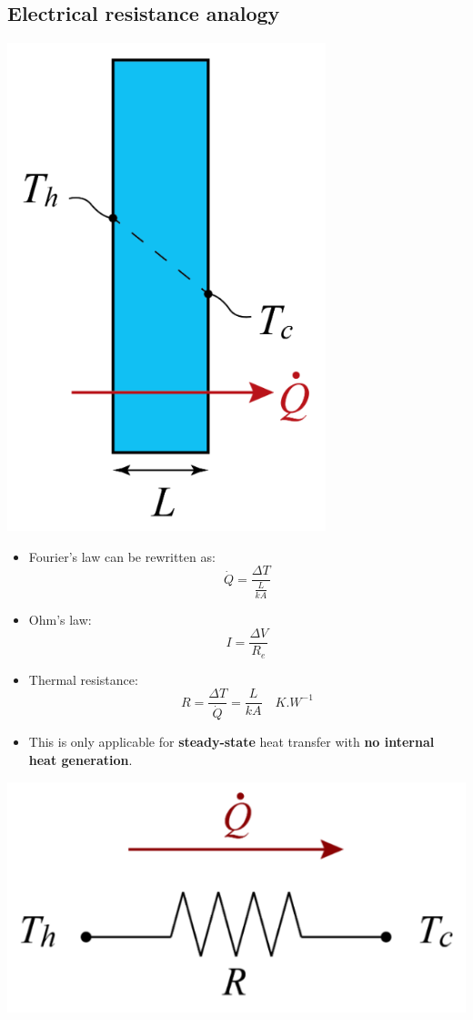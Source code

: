 \documentclass[11pt]{article}
\begin{document}
\subsection{Electrical resistance analogy}
\label{sec:orge9eb20f}
\begin{center}
\includegraphics[scale=0.7]{./images/steady-state-heat-conduction-fouriers-law.png}
\end{center}
\begin{itemize}
\item Fourier's law can be rewritten as:
\[\dot{Q} = \frac{\Delta T}{\frac{L}{kA}}\]
\item Ohm's law:
\[I = \frac{\Delta V}{R_e}\]
\item Thermal resistance:
\[R = \frac{\Delta T}{\dot{Q}} = \frac{L}{kA} \quad \unit{K.W^{-1}}\]
\item This is only applicable for \textbf{steady-state} heat transfer with \textbf{no internal heat generation}.
\end{itemize}
\begin{center}
\includegraphics[scale=0.7]{./images/steady-state-heat-conduction-electrical-resistance-analogy.png}
\end{center}
\end{document}
